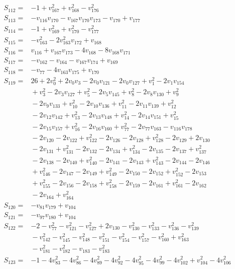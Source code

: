 \begin{align*}
S_{112}={}&-1+v_{167}^{2}+v_{168}^{2}-v_{176}^{2}\\
S_{113}={}&-v_{116}v_{170}-v_{167}v_{170}v_{173}-v_{170}+v_{177}\\
S_{114}={}&-1+v_{169}^{2}+v_{170}^{2}-v_{177}^{2}\\
S_{115}={}&-v_{163}^{2}-2v_{163}^{2}v_{172}+v_{168}\\
S_{116}={}&v_{116}+v_{167}v_{173}-4v_{168}-8v_{168}v_{171}\\
S_{117}={}&-v_{162}-v_{164}-v_{167}v_{174}+v_{169}\\
S_{118}={}&-v_{77}-4v_{163}v_{175}+v_{170}\\
S_{119}={}&26+2v_{0}^{2}+2v_{0}v_{3}-2v_{0}v_{121}-2v_{0}v_{127}+v_{1}^{2}-2v_{1}v_{154}\\
&{}+v_{3}^{2}-2v_{3}v_{127}+v_{5}^{2}-2v_{5}v_{145}+v_{8}^{2}-2v_{8}v_{130}+v_{9}^{2}\\
&{}-2v_{9}v_{133}+v_{10}^{2}-2v_{10}v_{136}+v_{11}^{2}-2v_{11}v_{139}+v_{12}^{2}\\
&{}-2v_{12}v_{142}+v_{13}^{2}-2v_{13}v_{148}+v_{14}^{2}-2v_{14}v_{151}+v_{15}^{2}\\
&{}-2v_{15}v_{157}+v_{16}^{2}-2v_{16}v_{160}+v_{77}^{2}-2v_{77}v_{163}-v_{116}v_{178}\\
&{}-2v_{120}-2v_{122}+v_{122}^{2}-2v_{126}-2v_{128}+v_{128}^{2}-2v_{129}+2v_{130}\\
&{}-2v_{131}+v_{131}^{2}-2v_{132}-2v_{134}+v_{134}^{2}-2v_{135}-2v_{137}+v_{137}^{2}\\
&{}-2v_{138}-2v_{140}+v_{140}^{2}-2v_{141}-2v_{143}+v_{143}^{2}-2v_{144}-2v_{146}\\
&{}+v_{146}^{2}-2v_{147}-2v_{149}+v_{149}^{2}-2v_{150}-2v_{152}+v_{152}^{2}-2v_{153}\\
&{}+v_{155}^{2}-2v_{156}-2v_{158}+v_{158}^{2}-2v_{159}-2v_{161}+v_{161}^{2}-2v_{162}\\
&{}-2v_{164}+v_{164}^{2}\\
S_{120}={}&-v_{81}v_{179}+v_{104}\\
S_{121}={}&-v_{97}v_{180}+v_{104}\\
S_{122}={}&-2-v_{77}^{2}-v_{121}^{2}-v_{127}^{2}+2v_{130}-v_{130}^{2}-v_{133}^{2}-v_{136}^{2}-v_{139}^{2}\\
&{}-v_{142}^{2}-v_{145}^{2}-v_{148}^{2}-v_{151}^{2}-v_{154}^{2}-v_{157}^{2}-v_{160}^{2}+v_{163}^{2}\\
&{}-v_{181}^{2}-v_{182}^{2}-v_{183}-v_{183}^{2}\\
S_{123}={}&-1-4v_{83}^{2}-4v_{86}^{2}-4v_{89}^{2}-4v_{92}^{2}-4v_{95}^{2}-4v_{99}^{2}-4v_{102}^{2}+v_{104}^{2}-4v_{106}^{2}\\

\end{align*}
